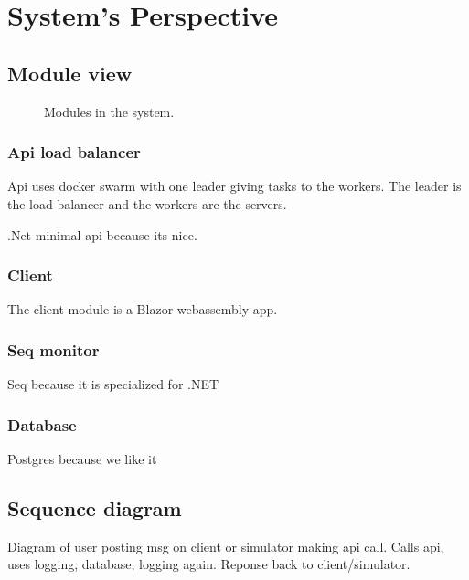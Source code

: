 \section{System's Perspective}
\label{ch:sys_persp} %

\subsection{Module view}

\begin{figure}[H]
    \centering
    \caption{Modules in the system.}
    \label{fig:modules}
\end{figure}

\subsubsection{Api load balancer}

Api uses docker swarm with one leader giving tasks 
to the workers. The leader is the load balancer 
and the workers are the servers. 

.Net minimal api because its nice.

\subsubsection{Client}

The client module is a Blazor webassembly app.

\subsubsection{Seq monitor}

Seq\cite{seq} because it is specialized for .NET

\subsubsection{Database}

Postgres because we like it


\subsection{Sequence diagram}

Diagram of user posting msg on client or simulator making api call. 
Calls api, uses logging, database, logging again. Reponse back to client/simulator.

\begin{figure}[H]
    \centering
    \caption{}
    \label{fig:sequence_diagram}
\end{figure}
